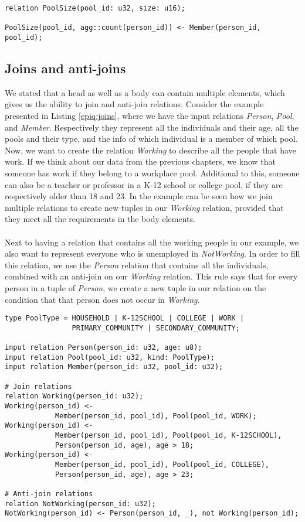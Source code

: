 \begin{lstlisting}[caption={Aggregate count function.}, label={epiq:aggregate}]
relation PoolSize(pool_id: u32, size: u16);

PoolSize(pool_id, agg::count(person_id)) <- Member(person_id, pool_id);
\end{lstlisting}

\subsection{Joins and anti-joins}
\label{subsec:joins_and_anti-joins}
We stated that a head as well as a body can contain multiple elements, which gives us the ability to join and anti-join relations. Consider the example presented in Listing \ref{epiq:joins}, where we have the input relations \textit{Person}, \textit{Pool}, and \textit{Member}. Respectively they represent all the individuals and their age, all the pools and their type, and the info of which individual is a member of which pool. Now, we want to create the relation \textit{Working} to describe all the people that have work. If we think about our data from the previous chapters, we know that someone has work if they belong to a workplace pool. Additional to this, someone can also be a teacher or professor in a K-12 school or college pool, if they are respectively older than 18 and 23. In the example can be seen how we join multiple relations to create new tuples in our \textit{Working} relation, provided that they meet all the requirements in the body elements.
\\\\
Next to having a relation that contains all the working people in our example, we also want to represent everyone who is unemployed in \textit{NotWorking}. In order to fill this relation, we use the \textit{Person} relation that contains all the individuals, combined with an anti-join on our \textit{Working} relation. This rule says that for every person in a tuple of \textit{Person}, we create a new tuple in our relation on the condition that that person does not occur in \textit{Working}.

\begin{lstlisting}[float, caption={Join and anti-join rules.}, label={epiq:joins}]
type PoolType = HOUSEHOLD | K-12SCHOOL | COLLEGE | WORK |
                PRIMARY_COMMUNITY | SECONDARY_COMMUNITY;

input relation Person(person_id: u32, age: u8);
input relation Pool(pool_id: u32, kind: PoolType);
input relation Member(person_id: u32, pool_id: u32);

# Join relations
relation Working(person_id: u32);
Working(person_id) <- 
            Member(person_id, pool_id), Pool(pool_id, WORK);
Working(person_id) <-
            Member(person_id, pool_id), Pool(pool_id, K-12SCHOOL),
            Person(person_id, age), age > 18;
Working(person_id) <-
            Member(person_id, pool_id), Pool(pool_id, COLLEGE),
            Person(person_id, age), age > 23;

# Anti-join relations
relation NotWorking(person_id: u32);
NotWorking(person_id) <- Person(person_id, _), not Working(person_id);
\end{lstlisting}


